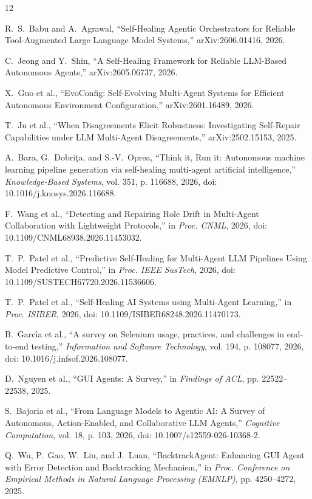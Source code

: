 \documentclass[conference]{IEEEtran}
\begin{document}
\begin{thebibliography}{12}

R.~S.~Babu and A.~Agrawal, ``Self-Healing Agentic Orchestrators for Reliable Tool-Augmented Large Language Model Systems,'' arXiv:2606.01416, 2026.

C.~Jeong and Y.~Shin, ``A Self-Healing Framework for Reliable LLM-Based Autonomous Agents,'' arXiv:2605.06737, 2026.

X.~Guo et al., ``EvoConfig: Self-Evolving Multi-Agent Systems for Efficient Autonomous Environment Configuration,'' arXiv:2601.16489, 2026.

T.~Ju et al., ``When Disagreements Elicit Robustness: Investigating Self-Repair Capabilities under LLM Multi-Agent Disagreements,'' arXiv:2502.15153, 2025.

A.~Bara, G.~Dobri\c{t}a, and S.-V.~Oprea, ``Think it, Run it: Autonomous machine learning pipeline generation via self-healing multi-agent artificial intelligence,'' \emph{Knowledge-Based Systems}, vol. 351, p. 116688, 2026, doi: 10.1016/j.knosys.2026.116688.

F.~Wang et al., ``Detecting and Repairing Role Drift in Multi-Agent Collaboration with Lightweight Protocols,'' in \emph{Proc. CNML}, 2026, doi: 10.1109/CNML68938.2026.11453032.

T.~P.~Patel et al., ``Predictive Self-Healing for Multi-Agent LLM Pipelines Using Model Predictive Control,'' in \emph{Proc. IEEE SusTech}, 2026, doi: 10.1109/SUSTECH67720.2026.11536606.

T.~P.~Patel et al., ``Self-Healing AI Systems using Multi-Agent Learning,'' in \emph{Proc. ISIBER}, 2026, doi: 10.1109/ISIBER68248.2026.11470173.

B.~Garc\'{\i}a et al., ``A survey on Selenium usage, practices, and challenges in end-to-end testing,'' \emph{Information and Software Technology}, vol. 194, p. 108077, 2026, doi: 10.1016/j.infsof.2026.108077.

D.~Nguyen et al., ``GUI Agents: A Survey,'' in \emph{Findings of ACL}, pp. 22522--22538, 2025.

S.~Bajoria et al., ``From Language Models to Agentic AI: A Survey of Autonomous, Action-Enabled, and Collaborative LLM Agents,'' \emph{Cognitive Computation}, vol. 18, p. 103, 2026, doi: 10.1007/s12559-026-10368-2.

Q.~Wu, P.~Gao, W.~Liu, and J.~Luan, ``BacktrackAgent: Enhancing GUI Agent with Error Detection and Backtracking Mechanism,'' in \emph{Proc. Conference on Empirical Methods in Natural Language Processing (EMNLP)}, pp. 4250--4272, 2025.

\end{thebibliography}
\end{document}

